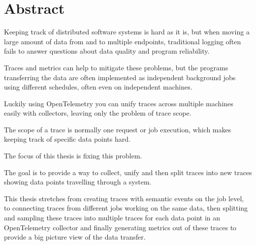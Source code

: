 \chapter{Abstract}

Keeping track of distributed software systems is hard as it is, 
but when moving a large amount of data from and to multiple endpoints, 
traditional logging often fails to answer questions about data quality and program reliability.

Traces and metrics can help to mitigate these problems, but the programs
transferring the data are often implemented as independent background jobs 
using different schedules, often even on independent machines.

Luckily using OpenTelemetry you can unify traces across multiple machines easily with collectors, 
leaving only the problem of trace scope.\par

The scope of a trace is normally one request or job execution,
which makes keeping track of specific data points hard.

The focus of this thesis is fixing this problem.\par

The goal is to provide a way to collect, unify and then split traces into new traces 
showing data points travelling through a system. 

This thesis stretches from creating traces with semantic events on the job level, 
to connecting traces from different jobs working on the same data, 
then splitting and sampling these traces into multiple traces for each data point 
in an OpenTelemetry collector and finally generating metrics out of these traces to 
provide a big picture view of the data transfer.
